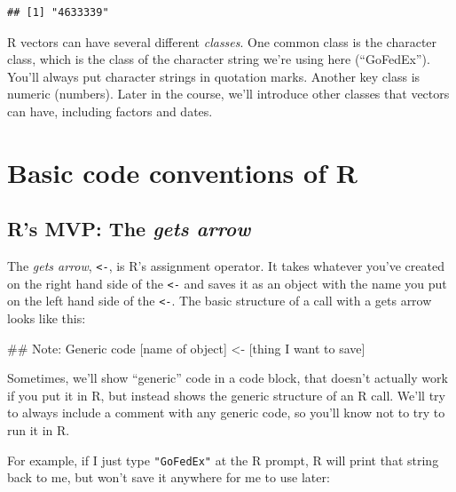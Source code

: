 \documentclass[]{book}
\makeatletter
\newenvironment{Shaded}{\begin{snugshade}}{\end{snugshade}}
\newcommand{\StringTok}[1]{\textcolor[rgb]{0.31,0.60,0.02}{#1}}
\newcommand{\NormalTok}[1]{#1}
\newenvironment{kframe}{%
\medskip{}
\setlength{\fboxsep}{.8em}
 \def\at@end@of@kframe{}%
 \ifinner\ifhmode%
  \def\at@end@of@kframe{\end{minipage}}%
  \begin{minipage}{\columnwidth}%
 \fi\fi%
 \def\FrameCommand##1{\hskip\@totalleftmargin \hskip-\fboxsep
 \colorbox{shadecolor}{##1}\hskip-\fboxsep
     \hskip-\linewidth \hskip-\@totalleftmargin \hskip\columnwidth}%
 \MakeFramed {\advance\hsize-\width
   \@totalleftmargin\z@ \linewidth\hsize
   \@setminipage}}%
 {\par\unskip\endMakeFramed%
 \at@end@of@kframe}
\renewenvironment{Shaded}{\begin{kframe}}{\end{kframe}}
\newenvironment{rmdblock}[1]
  {
  \begin{itemize}
  \renewcommand{\labelitemi}{
    \raisebox{-.7\height}[0pt][0pt]{
      {\setkeys{Gin}{width=3em,keepaspectratio}\texttt{[image: images/\#1]}}
    }
  }
  \setlength{\fboxsep}{1em}
  \begin{kframe}
  \item
  }
  {
  \end{kframe}
  \end{itemize}
  }
\newenvironment{rmdnote}
  {\begin{rmdblock}{note}}
  {\end{rmdblock}}
\newenvironment{rmdwarning}
  {\begin{rmdblock}{warning}}
  {\end{rmdblock}}
\theoremstyle{definition}
\theoremstyle{definition}
\theoremstyle{definition}
\theoremstyle{remark}
\makeatother
\begin{document}
\begin{verbatim}
## [1] "4633339"
\end{verbatim}

\begin{rmdnote}
R vectors can have several different \emph{classes}. One common class is
the character class, which is the class of the character string we're
using here (``GoFedEx''). You'll always put character strings in
quotation marks. Another key class is numeric (numbers). Later in the
course, we'll introduce other classes that vectors can have, including
factors and dates.
\end{rmdnote}

\section{Basic code conventions of R}\label{basic-code-conventions-of-r}

\subsection{\texorpdfstring{R's MVP: The \emph{gets
arrow}}{R's MVP: The gets arrow}}\label{rs-mvp-the-gets-arrow}

The \emph{gets arrow}, \texttt{\textless{}-}, is R's assignment
operator. It takes whatever you've created on the right hand side of the
\texttt{\textless{}-} and saves it as an object with the name you put on
the left hand side of the \texttt{\textless{}-}. The basic structure of
a call with a gets arrow looks like this:

\begin{Shaded}
\begin{Highlighting}[]
\NormalTok{## Note: Generic code}
\NormalTok{[name of object] <-}\StringTok{ }\NormalTok{[thing I want to save]}
\end{Highlighting}
\end{Shaded}

\begin{rmdwarning}
Sometimes, we'll show ``generic'' code in a code block, that doesn't
actually work if you put it in R, but instead shows the generic
structure of an R call. We'll try to always include a comment with any
generic code, so you'll know not to try to run it in R.
\end{rmdwarning}

For example, if I just type \texttt{"GoFedEx"} at the R prompt, R will
print that string back to me, but won't save it anywhere for me to use
later:
\end{document}
